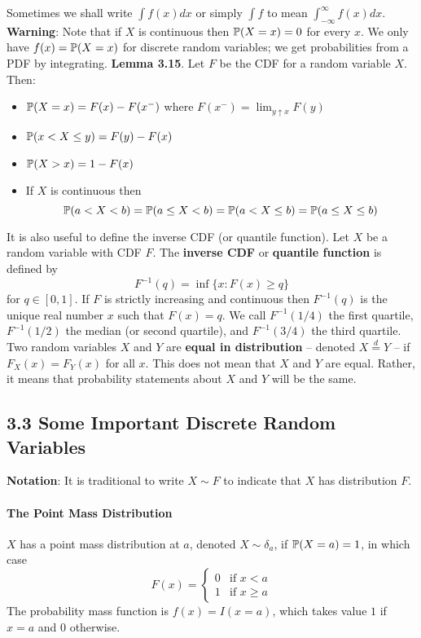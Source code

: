 Sometimes we shall write \(\int f(x) dx\) or simply \(\int f\) to mean \(\int_{-\infty}^{\infty} f(x) dx\).
\textbf{Warning}: Note that if \(X\) is continuous then \(\operatorname{\mathbb{P}}(X = x) = 0\) for every \(x\). We only have \(f(x) = \operatorname{\mathbb{P}}(X = x)\) for discrete random variables; we get probabilities from a PDF by integrating.
\textbf{Lemma 3.15}. Let \(F\) be the CDF for a random variable \(X\).
Then:
\begin{itemize}
\item
  \(\operatorname{\mathbb{P}}(X = x) = F(x) - F(x^-)\) where
  \(F(x^-) = \lim_{y \uparrow x} F(y)\)
\item
  \(\operatorname{\mathbb{P}}(x < X \leq y) = F(y) - F(x)\)
\item
  \(\operatorname{\mathbb{P}}(X > x) = 1 - F(x)\)
\item
  If \(X\) is continuous then
  \[
 \operatorname{\mathbb{P}}(a < X < b) 
  = \operatorname{\mathbb{P}}(a \leq X < b) 
  = \operatorname{\mathbb{P}}(a < X \leq b) 
  = \operatorname{\mathbb{P}}(a \leq X \leq b)
\]
\end{itemize}
It is also useful to define the inverse CDF (or quantile function).
Let \(X\) be a random variable with CDF \(F\). The \textbf{inverse CDF} or \textbf{quantile function} is defined by
\[
F^{-1}(q) = \inf \{ x : F(x) \ge q \}
\]
for \(q \in [0, 1]\). If \(F\) is strictly increasing and continuous then \(F^{-1}(q)\) is the unique real number \(x\) such that \(F(x) = q\).
We call \(F^{-1}(1/4)\) the first quartile, \(F^{-1}(1/2)\) the median (or second quartile), and \(F^{-1}(3/4)\) the third quartile.
Two random variables \(X\) and \(Y\) are \textbf{equal in distribution} -- denoted \(X \overset{d}= Y\) -- if \(F_X(x) = F_Y(x)\) for all \(x\). This does not mean that \(X\) and \(Y\) are equal. Rather, it means that probability statements about \(X\) and \(Y\) will be the same.

\subsection*{3.3 Some Important Discrete Random Variables}\label{some-important-discrete-random-variables}
\textbf{Notation}: It is traditional to write \(X \sim F\) to indicate that \(X\) has distribution \(F\). 
\paragraph{The Point Mass Distribution}\label{the-point-mass-distribution}
\(X\) has a point mass distribution at \(a\), denoted \(X \sim \delta_a\), if \(\operatorname{\mathbb{P}}(X = a) = 1\), in which case
\[
F(x) = 
\begin{cases}
0 &\text{if } x < a 
\\[
1ex]
1 &\text{if } x \geq a
\end{cases}
\]
The probability mass function is \(f(x) = I(x = a)\), which takes value $1$ if \(x = a\) and 0 otherwise.
